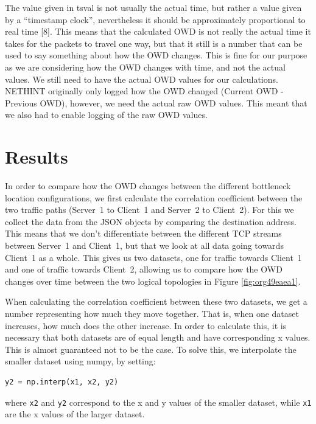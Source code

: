 \documentclass[a4paper,11pt]{article}
\makeatletter
\newcommand{\cslcitation}[2]
 {\protect\hyper@linkstart{cite}{citeproc_bib_item_#1}#2\hyper@linkend}
\makeatother
\begin{document}
The value given in tsval is not usually the actual time, but rather a value given by a ``timestamp clock'', nevertheless it should be approximately proportional to real time \cslcitation{8}{[8]}. This means that the calculated OWD is not really the actual time it takes for the packets to travel one way, but that it still is a number that can be used to say something about how the OWD changes. This is fine for our purpose as we are considering how the OWD changes with time, and not the actual values. We still need to have the actual OWD values for our calculations. NETHINT originally only logged how the OWD changed (Current OWD - Previous OWD), however, we need the actual raw OWD values. This meant that we also had to enable logging of the raw OWD values.
\section{Results}
\label{sec:org1cf5f71}
In order to compare how the OWD changes between the different bottleneck location configurations, we first calculate the correlation coefficient between the two traffic paths (Server~1 to Client~1 and Server~2 to Client~2). For this we collect the data from the JSON objects by comparing the destination address. This means that we don't differentiate between the different TCP streams between Server~1 and Client~1, but that we look at all data going towards Client~1 as a whole. This gives us two datasets, one for traffic towards Client~1 and one of traffic towards Client~2, allowing us to compare how the OWD changes over time between the two logical topologies in Figure \ref{fig:org49eaea1}.

When calculating the correlation coefficient between these two datasets, we get a number representing how much they move together. That is, when one dataset increases, how much does the other increase. In order to calculate this, it is necessary that both datasets are of equal length and have corresponding x values. This is almost guaranteed not to be the case. To solve this, we interpolate the smaller dataset using numpy, by setting:
\begin{lstlisting}[basicstyle=\ttfamily\footnotesize,breaklines=true,showstringspaces=false,postbreak=\mbox{$\hookrightarrow$\space},tabsize=2,language=Python,numbers=none]
y2 = np.interp(x1, x2, y2)
\end{lstlisting}
where \texttt{x2} and \texttt{y2} correspond to the x and y values of the smaller dataset, while \texttt{x1} are the x values of the larger dataset.
\end{document}
